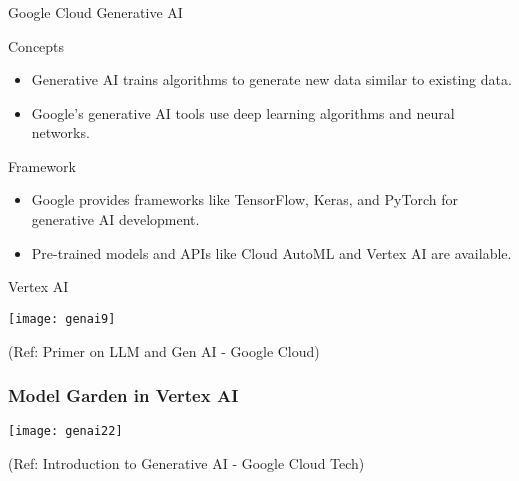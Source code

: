 \begin{frame}[fragile]\frametitle{}
\begin{center}
{\Large Google Cloud Generative AI}
\end{center}
\end{frame}

\begin{frame}[fragile]{Concepts}
\begin{itemize}
\item Generative AI trains algorithms to generate new data similar to existing data.
\item Google's generative AI tools use deep learning algorithms and neural networks.
\end{itemize}
\end{frame}

\begin{frame}[fragile]{Framework}
\begin{itemize}
\item Google provides frameworks like TensorFlow, Keras, and PyTorch for generative AI development.
\item Pre-trained models and APIs like Cloud AutoML and Vertex AI are available.
\end{itemize}
\end{frame}

\begin{frame}[fragile]{Vertex AI}

\begin{center}
\texttt{[image: genai9]}
\end{center}

{\tiny (Ref: Primer on LLM and Gen AI - Google Cloud)}
  
\end{frame}


\begin{frame}[fragile]\frametitle{Model Garden in Vertex AI}

\begin{center}
\texttt{[image: genai22]}
\end{center}


{\tiny (Ref: Introduction to Generative AI - Google Cloud Tech)}

\end{frame}

